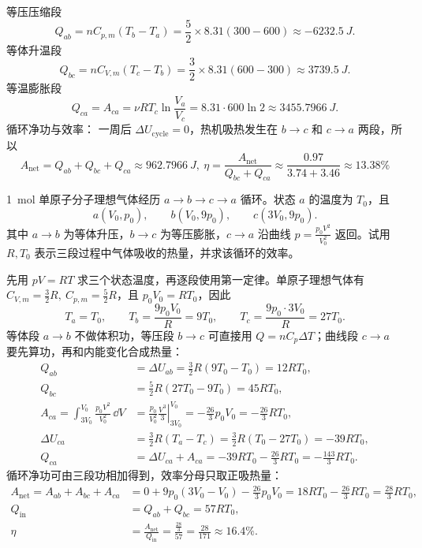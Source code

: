 \documentclass[lang=cn,11pt]{elegantbook}
\begin{document}
\begin{solution}
等压压缩段
 \[Q_{ab}=nC_{p,m}(T_b-T_a) =\frac52\times 8.31(300-600) \approx \SI{-6232.5}{J}.\]
等体升温段
 \[Q_{bc}=nC_{V,m}(T_c-T_b) =\frac32\times 8.31(600-300) \approx \SI{3739.5}{J}.\]
等温膨胀段
 \[Q_{ca}=A_{ca}=\nu RT_c\ln\frac{V_a}{V_c} =8.31\cdot600\ln2 \approx \SI{3455.7966}{J}.\] 
循环净功与效率： 一周后 \(\Delta U_{\text{cycle}}=0\)，热机吸热发生在 \(b\to c\) 和 \(c\to a\) 两段，所以
 \[A_{\text{net}}=Q_{ab}+Q_{bc}+Q_{ca} \approx \SI{962.7966}{J},~\eta=\frac{A_{\text{net}}}{Q_{bc}+Q_{ca}} \approx \frac{0.97}{3.74+3.46} \approx 13.38\%\] 
\end{solution}

\begin{exercise}[2015-2016期末：单原子气体沿抛物线回到初态的循环效率]
\SI{1}{mol} 单原子分子理想气体经历 \(a\to b\to c\to a\) 循环。状态 \(a\) 的温度为 \(T_0\)，且
\[
a(V_0,p_0),\qquad b(V_0,9p_0),\qquad c(3V_0,9p_0).
\]
其中 \(a\to b\) 为等体升压，\(b\to c\) 为等压膨胀，\(c\to a\) 沿曲线
 \(p=\frac{p_0V^2}{V_0^2}\) 
返回。试用 \(R,T_0\) 表示三段过程中气体吸收的热量，并求该循环的效率。
\end{exercise}

\begin{solution}
先用 \(pV=RT\) 求三个状态温度，再逐段使用第一定律。单原子理想气体有 \(C_{V,m}=\frac32R,\ C_{p,m}=\frac52R\)，且 \(p_0V_0=RT_0\)，因此
 \[T_a=T_0,\qquad T_b=\frac{9p_0V_0}{R}=9T_0,\qquad T_c=\frac{9p_0\cdot3V_0}{R}=27T_0.\]
等体段 \(a\to b\) 不做体积功，等压段 \(b\to c\) 可直接用 \(Q=nC_p\Delta T\)；曲线段 \(c\to a\) 要先算功，再和内能变化合成热量：
\[
\begin{aligned}
Q_{ab}&=\Delta U_{ab}
=\frac32R(9T_0-T_0)
=12RT_0,\\
Q_{bc}&=\frac52R(27T_0-9T_0)
=45RT_0,\\
A_{ca}=\int_{3V_0}^{V_0}\frac{p_0V^2}{V_0^2}\,\dd V
&=\frac{p_0}{V_0^2}\left.\frac{V^3}{3}\right|_{3V_0}^{V_0}
=-\frac{26}{3}p_0V_0
=-\frac{26}{3}RT_0,\\
\Delta U_{ca}&=\frac32R(T_a-T_c)
=\frac32R(T_0-27T_0)
=-39RT_0,\\
Q_{ca}&=\Delta U_{ca}+A_{ca}
=-39RT_0-\frac{26}{3}RT_0
=-\frac{143}{3}RT_0.
\end{aligned}
\]
循环净功可由三段功相加得到，效率分母只取正吸热量：
\[
\begin{aligned}
A_{\text{net}}=A_{ab}+A_{bc}+A_{ca}
&=0+9p_0(3V_0-V_0)-\frac{26}{3}p_0V_0=18RT_0-\frac{26}{3}RT_0
=\frac{28}{3}RT_0,\\
Q_{\text{in}}&=Q_{ab}+Q_{bc}=57RT_0,\\
\eta&=\frac{A_{\text{net}}}{Q_{\text{in}}}
=\frac{\frac{28}{3}}{57}
=\frac{28}{171}
\approx16.4\%.
\end{aligned}
\]
\end{solution}
\end{document}
